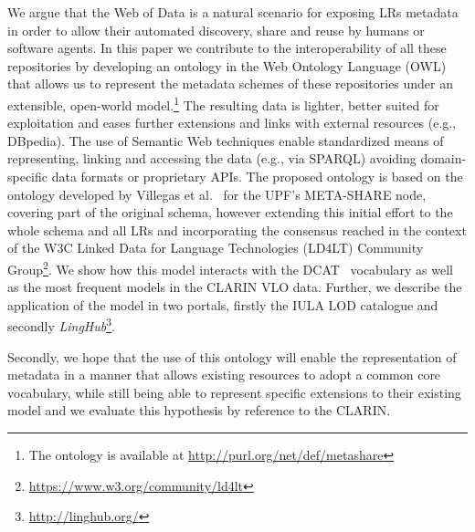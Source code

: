 \documentclass{llncs}
\begin{document}
We argue that the Web of Data is a natural scenario for exposing LRs metadata in order to allow their automated discovery, share and reuse by humans or software agents. %
In this paper we contribute to the interoperability of all these repositories by
developing an ontology in the Web Ontology Language (OWL)~\cite{motik2012owl}
that allows us to represent the metadata schemes of these repositories under an
extensible, open-world model.\footnote{The ontology is available at
\url{http://purl.org/net/def/metashare}}
The resulting data is lighter, better suited for exploitation and eases further extensions and links with external resources (e.g., DBpedia).
The use of Semantic Web techniques enable standardized means of representing, linking and 
accessing the data (e.g., via SPARQL) avoiding domain-specific data formats or proprietary APIs.
The proposed ontology is based on the ontology developed by Villegas et al.~\cite{Villegas2014} for the UPF's META-SHARE node, covering part of the original schema, however extending this initial effort to the whole schema and all LRs and incorporating the consensus
reached in the context of the W3C Linked Data for Language Technologies (LD4LT) Community Group\footnote{\url{https://www.w3.org/community/ld4lt}}.
We show how this model interacts with the DCAT~\cite{maali2014data} vocabulary
as well as the most frequent models in the CLARIN VLO data.
Further, we describe the application of the model in two portals, firstly the
IULA LOD catalogue and secondly
\emph{LingHub}\footnote{\url{http://linghub.org/}}.

Secondly, we hope that the use of this ontology will enable the representation of metadata in a manner that allows existing resources to adopt a
common core vocabulary, while still being able to represent specific extensions
to their existing model and we evaluate this hypothesis by reference to the
CLARIN.
\end{document}
